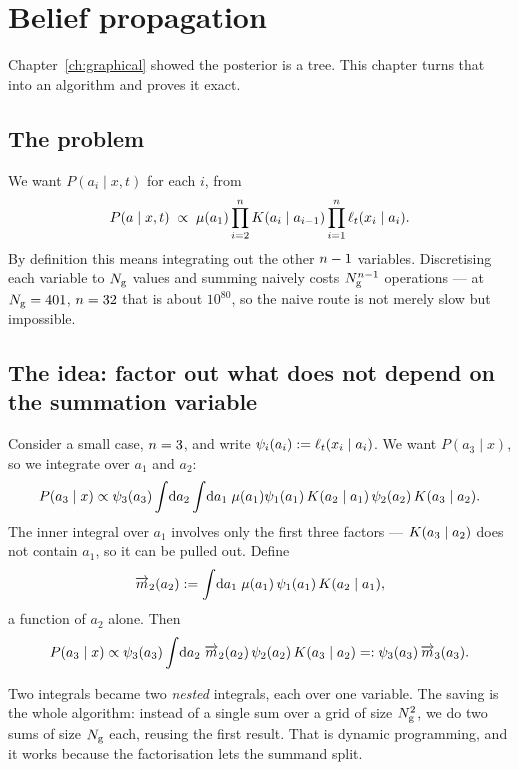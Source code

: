 \chapter{Belief propagation}
\label{ch:bp}

Chapter~\ref{ch:graphical} showed the posterior is a tree. This chapter turns that into an
algorithm and proves it exact.

\section{The problem}

We want $P(a_i\mid x,t)$ for each $i$, from
\begin{equation}
P(a\mid x,t) \;\propto\; \mu(a_1)\prod_{i=2}^{n}K(a_i\mid a_{i-1})
\prod_{i=1}^{n}\ell_t(x_i\mid a_i).
\end{equation}
By definition this means integrating out the other $n-1$ variables. Discretising each
variable to $N_{\mathrm{g}}$ values and summing naively costs $N_{\mathrm{g}}^{n-1}$ operations --- at
$N_{\mathrm{g}}=401$, $n=32$ that is about $10^{80}$, so the naive route is not merely slow but
impossible.

\section{The idea: factor out what does not depend on the summation variable}

Consider a small case, $n=3$, and write $\psi_i(a_i) := \ell_t(x_i\mid a_i)$. We want
$P(a_3\mid x)$, so we integrate over $a_1$ and $a_2$:
\[
P(a_3\mid x) \propto \psi_3(a_3)\int\!\mathrm{d}a_2 \int\!\mathrm{d}a_1\;
\mu(a_1)\psi_1(a_1)\,K(a_2\mid a_1)\,\psi_2(a_2)\,K(a_3\mid a_2).
\]
The inner integral over $a_1$ involves only the first three factors --- $K(a_3\mid a_2)$
does not contain $a_1$, so it can be pulled out. Define
\[
\overrightarrow{m}_2(a_2) := \int\!\mathrm{d}a_1\; \mu(a_1)\,\psi_1(a_1)\,K(a_2\mid a_1),
\]
a function of $a_2$ alone. Then
\[
P(a_3\mid x) \propto \psi_3(a_3)\int\!\mathrm{d}a_2\;\overrightarrow{m}_2(a_2)\,\psi_2(a_2)\,K(a_3\mid a_2)
=: \psi_3(a_3)\,\overrightarrow{m}_3(a_3).
\]

\begin{intuition}
Two integrals became two \emph{nested} integrals, each over one variable. The saving is the
whole algorithm: instead of a single sum over a grid of size $N_{\mathrm{g}}^{2}$, we do two sums of
size $N_{\mathrm{g}}$ each, reusing the first result. That is dynamic programming, and it works
because the factorisation lets the summand split.
\end{intuition}

